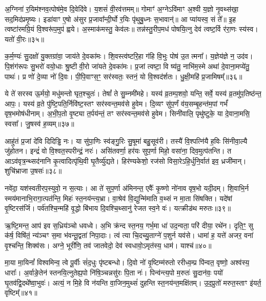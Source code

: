 {\anuvakamend[{प॒रि॒वा॒पात्प्र॒जां मयि॑ दुह्रते॒ चतु॑र्दश च॥10॥}]}

अ॒ग्निना॑ र॒यिम॑श्नव॒त्पोष॑मे॒व दि॒वेदि॑वे। य॒शसं॑ वी॒रव॑त्तमम्॥ गोमाꣳ॑ अ॒ग्ने\-ऽवि॑माꣳ अ॒श्वी य॒ज्ञो नृ॒वथ्स॑खा॒ सद॒मिद॑प्रमृ॒ष्यः। इडा॑वाꣳ ए॒षो अ॑सुर प्र॒जावा᳚न्दी॒र्घो र॒यिः पृ॑थुबु॒ध्नः स॒भावान्॑॥ आ प्या॑यस्व॒ सं ते᳚॥ इ॒ह त्वष्टा॑रमग्रि॒यं वि॒श्वरू॑प॒मुप॑ ह्वये। अ॒स्माक॑मस्तु॒ केव॑लः॥ तन्न॑स्तु॒रीप॒मध॑ पोषयि॒त्नु देव॑ त्वष्ट॒र्वि र॑रा॒णः स्य॑स्व। यतो॑ वी॒रः॥३५॥

क॒र्म॒ण्यः॑ सु॒दक्षो॑ यु॒क्तग्रा॑वा॒ जाय॑ते दे॒वका॑मः। शि॒वस्त्व॑ष्टरि॒हा ग॑हि वि॒भुः पोष॑ उ॒त त्मना᳚। य॒ज्ञेय॑ज्ञे न॒ उद॑व। पि॒शंग॑रूपः सु॒भरो॑ वयो॒धाः श्रु॒ष्टी वी॒रो जा॑यते दे॒वका॑मः। प्र॒जां त्वष्टा॒ वि ष्य॑तु॒ नाभि॑म॒स्मे अथा॑ दे॒वाना॒मप्ये॑तु॒ पाथः॑। प्र णो॑ दे॒व्या नो॑ दि॒वः। पी॒पि॒वाꣳस॒ꣳ॒ सर॑स्वतः॒ स्तनं॒ यो वि॒श्वद॑र्शतः। धु॒क्षी॒महि॑ प्र॒जामिषम्᳚॥३६॥

ये ते॑ सरस्व ऊ॒र्मयो॒ मधु॑मन्तो घृत॒श्चुतः॑। तेषां᳚ ते सु॒म्नमी॑महे। यस्य॑ व्र॒तम्प॒शवो॒ यन्ति॒ सर्वे॒ यस्य॑ व्र॒तमु॑प॒तिष्ठ॑न्त॒ आपः॒। यस्य॑ व्र॒ते पु॑ष्टि॒पति॒र्निवि॑ष्ट॒स्तꣳ सर॑स्वन्त॒मव॑से हुवेम। दि॒व्यꣳ सु॑प॒र्णं व॑य॒सम्बृ॒हन्त॑म॒पां गर्भं॑ वृष॒भमोष॑धीनाम्। अ॒भी॒प॒तो वृ॒ष्ट्या त॒र्पय॑न्तं॒ तꣳ सर॑स्वन्त॒मव॑से हुवेम। सिनी॑वालि॒ पृथु॑ष्टुके॒ या दे॒वाना॒मसि॒ स्वसा᳚। जु॒षस्व॑ ह॒व्यम्॥३७॥

आहु॑तं प्र॒जां दे॑वि दिदिड्ढि नः। या सु॑पा॒णिः स्व॑ङ्गु॒रिः सु॒षूमा॑ बहु॒सूव॑री। तस्यै॑ वि॒श्पत्नि॑यै ह॒विः सि॑नीवा॒ल्यै जु॑होतन। इन्द्रं॑ वो वि॒श्वत॒स्परीन्द्रं॒ नरः॑। असि॑तवर्णा॒ हर॑यः सुप॒र्णा मिहो॒ वसा॑ना॒ दिव॒मुत्प॑तन्ति। त आ\-ऽव॑वृत्र॒न्थ्सद॑नानि कृ॒त्वादित्पृ॑थि॒वी घृ॒तैर्व्यु॑द्यते। हिर॑ण्यकेशो॒ रज॑सो विसा॒रे\-ऽहि॒र्धुनि॒र्वात॑ इव॒ ध्रजी॑मान्। शुचि॑भ्राजा उ॒षसः॑॥३८॥

नवे॑दा॒ यश॑स्वतीरप॒स्युवो॒ न स॒त्याः। आ ते॑ सुप॒र्णा अ॑मिनन्त॒ एवैः᳚ कृ॒ष्णो नो॑नाव वृष॒भो यदी॒दम्। शि॒वाभि॒र्न स्मय॑मानाभि॒रागा॒त्पत॑न्ति॒ मिहः॑ स्त॒नय॑न्त्य॒भ्रा। वा॒श्रेव॑ वि॒द्युन्मि॑माति व॒थ्सं न मा॒ता सि॑षक्ति। यदे॑षां वृ॒ष्टिरस॑र्जि। पर्व॑तश्चि॒न्महि॑ वृ॒द्धो बि॑भाय दि॒वश्चि॒थ्सानु॑ रेजत स्व॒ने वः॑। यत्क्रीड॑थ मरुतः॥३९॥

ऋ॒ष्टि॒मन्त॒ आप॑ इव स॒ध्रिय॑ञ्चो धवध्वे। अ॒भि क्र॑न्द स्त॒नय॒ गर्भ॒मा धा॑ उद॒न्वता॒ परि॑ दीया॒ रथे॑न। दृति॒ꣳ॒ सु क॑र्\mbox{}ष॒ विषि॑तं॒ न्य॑ञ्चꣳ स॒मा भ॑वन्तू॒द्वता॑ निपा॒दाः। त्वं त्या चि॒दच्यु॒ताग्ने॑ प॒शुर्न यव॑से। धामा॑ ह॒ यत्ते॑ अजर॒ वना॑ वृ॒श्चन्ति॒ शिक्व॑सः। अग्ने॒ भूरी॑णि॒ तव॑ जातवेदो॒ देव॑ स्वधावो॒\-ऽमृत॑स्य॒ धाम॑। याश्च॑॥४०॥

मा॒या मा॒यिनां᳚ विश्वमिन्व॒ त्वे पू॒र्वीः सं॑द॒धुः पृ॑ष्टबन्धो। दि॒वो नो॑ वृ॒ष्टिम्म॑रुतो ररीध्व॒म्प्र पि॑न्वत॒ वृष्णो॒ अश्व॑स्य॒ धाराः᳚। अ॒र्वाङे॒तेन॑ स्तनयि॒त्नुतेह्य॒पो नि॑षि॒ञ्चन्नसु॑रः पि॒ता नः॑। पिन्व॑न्त्य॒पो म॒रुतः॑ सु॒दान॑वः॒ पयो॑ घृ॒तव॑द्वि॒दथे᳚ष्वा॒भुवः॑। अत्यं॒ न मि॒हे वि न॑यन्ति वा॒जिन॒मुथ्सं॑ दुहन्ति स्त॒नय॑न्त॒मक्षि॑तम्। उ॒द॒प्रुतो॑ मरुत॒स्ताꣳ इ॑यर्त॒ वृष्टिम्᳚॥४१॥

